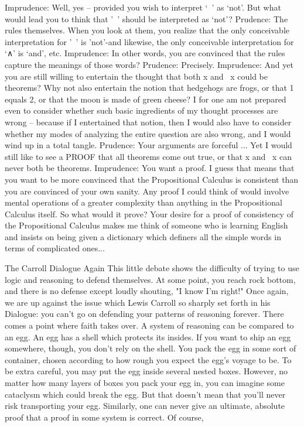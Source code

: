 Imprudence: Well, yes -- provided you wish to interpret `~' as `not'. But what would lead
   you to think that '~' should be interpreted as `not'?
Prudence: The rules themselves. When you look at them, you realize that the only
   conceivable interpretation for '~' is 'not'-and likewise, the only conceivable
   interpretation for `∧' is `and', etc.
Imprudence: In other words, you are convinced that the rules capture the meanings of
   those words?
Prudence: Precisely.
Imprudence: And yet you are still willing to entertain the thought that both x and ~x
   could be theorems? Why not also entertain the notion that hedgehogs are frogs, or that
   1 equals 2, or that the moon is made of green cheese? I for one am not prepared even
   to consider whether such basic ingredients of my thought processes are wrong --
   because if I entertained that notion, then I would also have to consider whether my
   modes of analyzing the entire question are also wrong, and I would wind up in a total
   tangle.
Prudence: Your arguments are forceful ... Yet I would still like to see a PROOF that all
   theorems come out true, or that x and ~x can never both be theorems.
Imprudence: You want a proof. I guess that means that you want to be more convinced
   that the Propositional Calculus is consistent than you are convinced of your own
   sanity. Any proof I could think of would involve mental operations of a greater
   complexity than anything in the Propositional Calculus itself. So what would it prove?
   Your desire for a proof of consistency of the Propositional Calculus makes me think
   of someone who is learning English and insists on being given a dictionary which
   definers all the simple words in terms of complicated ones...

                             The Carroll Dialogue Again
This little debate shows the difficulty of trying to use logic and reasoning to defend
themselves. At some point, you reach rock bottom, and there is no defense except loudly
shouting, "I know I'm right!" Once again, we are up against the issue which Lewis
Carroll so sharply set forth in his Dialogue: you can't go on defending your patterns of
reasoning forever. There comes a point where faith takes over.
        A system of reasoning can be compared to an egg. An egg has a shell which
protects its insides. If you want to ship an egg somewhere, though, you don't rely on the
shell. You pack the egg in some sort of container, chosen according to how rough you
expect the egg's voyage to be. To be extra careful, you may put the egg inside several
nested boxes. However, no matter how many layers of boxes you pack your egg in, you
can imagine some cataclysm which could break the egg. But that doesn't mean that you'll
never risk transporting your egg. Similarly, one can never give an ultimate, absolute
proof that a proof in some system is correct. Of course,





